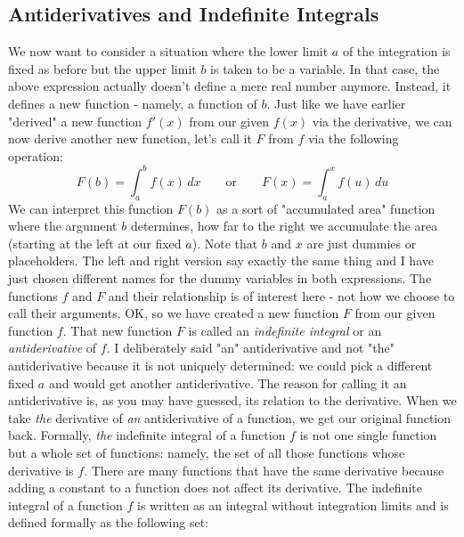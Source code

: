 


\subsection{Antiderivatives and Indefinite Integrals}
We now want to consider a situation where the lower limit $a$ of the integration is fixed as before but the upper limit $b$ is taken to be a variable. In that case, the above expression actually doesn't define a mere real number anymore. Instead, it defines a new function - namely, a function of $b$. Just like we have earlier "derived" a new function $f'(x)$ from our given $f(x)$ via the derivative, we can now derive another new function, let's call it $F$ from $f$ via the following operation:
\begin{equation}
F(b) = \int_a^b f(x) \, dx \qquad \text{or} \qquad
F(x) = \int_a^x f(u) \, du
\end{equation}
We can interpret this function $F(b)$ as a sort of "accumulated area" function where the argument $b$ determines, how far to the right we accumulate the area (starting at the left at our fixed $a$). Note that $b$ and $x$ are just dummies or placeholders. The left and right version say exactly the same thing and I have just chosen different names for the dummy variables in both expressions. The functions $f$ and $F$ and their relationship is of interest here - not how we choose to call their arguments. OK, so we have created a new function $F$ from our given function $f$. That new function $F$ is called an \emph{indefinite integral} or an \emph{antiderivative} of $f$. I deliberately said "an" antiderivative and not "the" antiderivative because it is not uniquely determined: we could pick a different fixed $a$ and would get another antiderivative. 
The reason for calling it an antiderivative is, as you may have guessed, its relation to the derivative. When we take \emph{the} derivative of \emph{an} antiderivative of a function, we get our original function back. Formally, \emph{the} indefinite integral of a function $f$ is not one single function but a whole set of functions: namely, the set of all those functions whose derivative is $f$. There are many functions that have the same derivative because adding a constant to a function does not affect its derivative. The indefinite integral of a function $f$ is written as an integral without integration limits and is defined formally as the following set:
